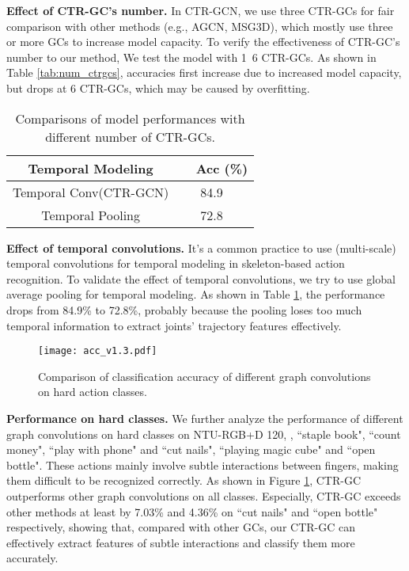 \documentclass[10pt,twocolumn,letterpaper]{article}
\begin{document}
\noindent \textbf{Effect of CTR-GC's number.} In CTR-GCN, we use three CTR-GCs for fair comparison with other methods (e.g., AGCN, MSG3D), which mostly use three or more GCs to increase model capacity. To verify the effectiveness of CTR-GC's number to our method, We test the model with 1~6 CTR-GCs. As shown in Table \ref{tab:num_ctrgcs}, accuracies first increase due to increased model capacity, but drops at 6 CTR-GCs, which may be caused by overfitting.

\begin{table}
	\begin{center}
		\begin{tabular}{c l}
			\hline
			\textbf{Temporal Modeling} & \ \ \textbf{Acc (\%)} \\
			\hline\hline
			Temporal Conv(CTR-GCN) & \ \ \ 84.9 \\
			\hline
			Temporal Pooling & \ \ \ 72.8 \\
			\hline
		\end{tabular}
	\end{center}
	\caption{Comparisons of model performances with different number of CTR-GCs.}
	\label{tab:temp_conv}
\end{table}

\noindent \textbf{Effect of temporal convolutions.} It's a common practice to use (multi-scale) temporal convolutions for temporal modeling in skeleton-based action recognition. To validate the effect of temporal convolutions, we try to use global average pooling for temporal modeling. As shown in Table \ref{tab:temp_conv}, the performance drops from 84.9\% to 72.8\%, probably because the pooling loses too much temporal information to extract joints' trajectory features effectively.

\begin{figure}[t]
	\centering
	\texttt{[image: acc\_v1.3.pdf]} \caption{Comparison of classification accuracy of different graph convolutions on hard action classes.} 
	\vspace{-0.3cm}
	\label{fig:acc}
\end{figure}

\noindent \textbf{Performance on hard classes.} We further analyze the performance of different graph convolutions on hard classes on NTU-RGB+D 120, \ie, ``staple book", ``count money", ``play with phone" and ``cut nails", ``playing magic cube" and ``open bottle". These actions mainly involve subtle interactions between fingers, making them difficult to be recognized correctly. As shown in Figure \ref{fig:acc}, CTR-GC outperforms other graph convolutions on all classes. Especially, CTR-GC exceeds other methods at least by 7.03\% and 4.36\% on ``cut nails" and ``open bottle" respectively, showing that, compared with other GCs, our CTR-GC can effectively extract features of subtle interactions and classify them more accurately.
\end{document}
